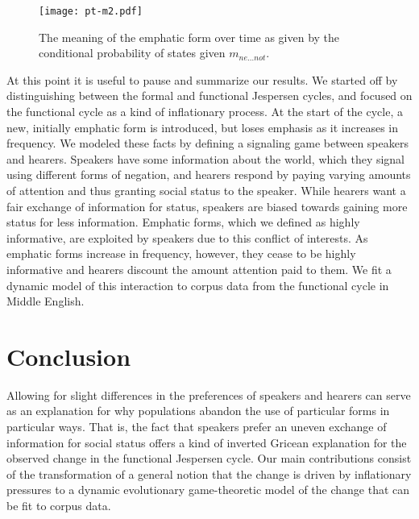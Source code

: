 \documentclass[linguex]{sp}
\theoremstyle{definition} \newtheorem{definition}{Definition}
\begin{document}
\begin{figure}
\centering
     \texttt{[image: pt-m2.pdf]}
\caption{The meaning of the emphatic form over time as given by the conditional probability of states given \textit{\color{blue} $m_{ne...not}$}.}
\label{m2-meaning}
\end{figure}

At this point it is useful to pause and summarize our results. We started off by distinguishing between the formal and functional Jespersen cycles, and focused on the functional cycle as a kind of inflationary process. At the start of the cycle, a new, initially emphatic form is introduced, but loses emphasis as it increases in frequency. We modeled these facts by defining a signaling game between speakers and hearers. Speakers have some information about the world, which they signal using different forms of negation, and hearers respond by paying varying amounts of attention and thus granting social status to the speaker. While hearers want a fair exchange of information for status, speakers are biased towards gaining more status for less information. Emphatic forms, which we defined as highly informative, are exploited by speakers due to this conflict of interests. As emphatic forms increase in frequency, however, they cease to be highly informative and hearers discount the amount attention paid to them. We fit a dynamic model of this interaction to corpus data from the functional cycle in Middle English.



\section{Conclusion}
\label{Conclusion}

Allowing for slight differences in the preferences of speakers and hearers can serve as an explanation for why populations abandon the use of particular forms in particular ways. That is, the fact that speakers prefer an uneven exchange of information for social status offers a kind of inverted Gricean explanation for the observed change in the functional Jespersen cycle. Our main contributions consist of the transformation of a general notion that the change is driven by inflationary pressures to a dynamic evolutionary game-theoretic model of the change that can be fit to corpus data. 
\end{document}
